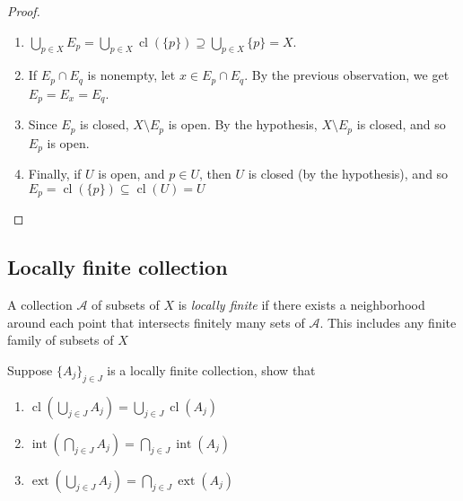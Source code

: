 \documentclass{treatise}
\begin{document}
\begin{proof}
\begin{enumerate}
    \item $\bigcup_{p \in X} E_p = \bigcup_{p \in X} \operatorname{cl}(\{ p \}) \supseteq \bigcup_{p \in X} \{ p \} = X$.
    \item If $E_p \cap E_q$ is nonempty, let $x \in E_p \cap E_q$. By the previous observation, we get $E_p = E_x =  E_q$.
    \item Since $E_p$ is closed, $X \setminus E_p$ is open. By the hypothesis, $X \setminus E_p$ is closed, and so $E_p$ is open.
    \item Finally, if $U$ is open, and $p \in U$, then $U$ is closed (by the hypothesis), and so $E_p = \operatorname{cl}(\{ p \}) \subseteq \operatorname{cl}(U) = U$
\end{enumerate}
\end{proof}

\subsection{Locally finite collection}
A collection $\mathcal{A}$ of subsets of $X$ is \emph{locally finite} if there exists a neighborhood around each point that intersects finitely many sets of $\mathcal{A}$. This includes any finite family of subsets of $X$
\begin{proposition}
Suppose $\{ A_j \}_{j \in J}$ is a locally finite collection, show that
\begin{enumerate}
    \item $\operatorname{cl} \left( \bigcup_{j \in J} A_j \right) = \bigcup_{j \in J} \operatorname{cl}(A_j)$
    \item $\operatorname{int} \left( \bigcap_{j \in J} A_j \right) = \bigcap_{j \in J} \operatorname{int}(A_j)$
    \item $\operatorname{ext} \left( \bigcup_{j \in J} A_j \right) = \bigcap_{j \in J} \operatorname{ext}(A_j)$
\end{enumerate}
\end{proposition}
\end{document}
